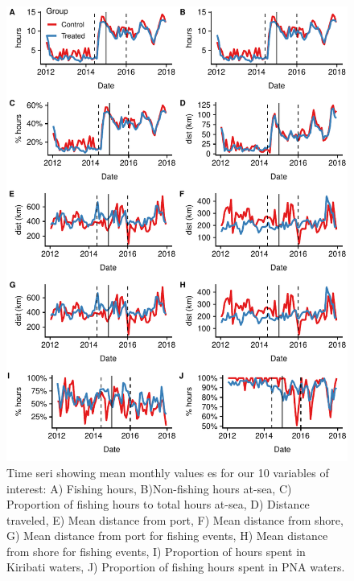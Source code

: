\documentclass[9pttwoside,lineno]{pnas-new}
\begin{document}
\begin{figure}
\centering
\includegraphics{img/all_panels.pdf}
\caption{\label{fig:all_panels}Time seri showing mean monthly values es for our 10 variables of interest:
A) Fishing hours, B)Non-fishing hours at-sea,
C) Proportion of fishing hours to total hours at-sea,
D) Distance traveled, E) Mean distance from port,
F) Mean distance from shore,
G) Mean distance from port for fishing events,
H) Mean distance from shore for fishing events,
I) Proportion of hours spent in Kiribati waters,
J) Proportion of fishing hours spent in PNA waters.}
\end{figure}

\clearpage
\begin{landscape}




\end{landscape}
\clearpage
\end{document}
